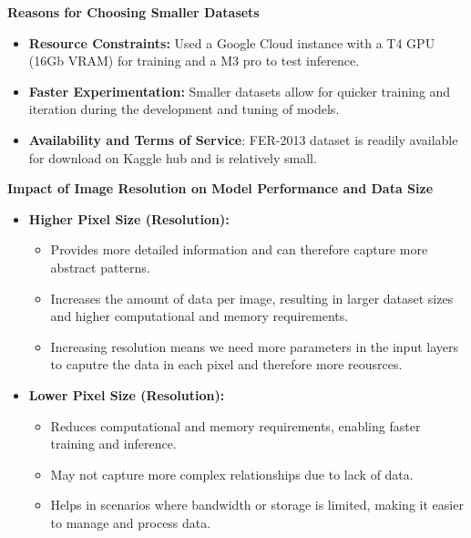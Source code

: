\documentclass{article}
\begin{document}
\textbf{Reasons for Choosing Smaller Datasets}

\begin{itemize}
    \item \textbf{Resource Constraints:} Used a Google Cloud instance with a T4 GPU (16Gb VRAM) for training and a M3 pro to test inference. 
    \item \textbf{Faster Experimentation:} Smaller datasets allow for quicker training and iteration during the development and tuning of models.
    \item \textbf{Availability and Terms of Service}: FER-2013 dataset is readily available for download on Kaggle hub and is relatively small.
\end{itemize}

\textbf{Impact of Image Resolution on Model Performance and Data Size}

\begin{itemize}
    \item \textbf{Higher Pixel Size (Resolution):}
    \begin{itemize}
        \item Provides more detailed information and can therefore capture more abstract patterns.
        \item Increases the amount of data per image, resulting in larger dataset sizes and higher computational and memory requirements.
        \item Increasing resolution means we need more parameters in the input layers to caputre the data in each pixel and therefore more reousrces.
    \end{itemize}
    \item \textbf{Lower Pixel Size (Resolution):}
    \begin{itemize}
        \item Reduces computational and memory requirements, enabling faster training and inference.
        \item May not capture more complex relationships due to lack of data.
        \item Helps in scenarios where bandwidth or storage is limited, making it easier to manage and process data.
    \end{itemize}
\end{itemize}
\end{document}
